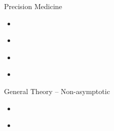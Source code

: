 \documentclass[aspectratio=169, professionalfonts]{beamer}
\begin{document}
\begin{frame}{Precision Medicine}
	\vfill
	\begin{itemize}
		\item \cite{laber2014Dynamic}
		      \vfill

		\item 	\cite{luedtke2016Statistical}
		      \vfill

		\item 	\cite{shi2022Statistical}

		\item \cite{hadad2021Confidence}
	\end{itemize}
	\vfill

\end{frame}

\begin{frame}{General Theory -- Non-asymptotic}
	\vfill
	\begin{itemize}
		\item \cite{waudby-smith2022Anytimevalid}
		      \vfill

		      \item\cite{howard2021Timeuniform}
	\end{itemize}
	\vfill


\end{frame}

\appendix
\printbibliography
\end{document}
